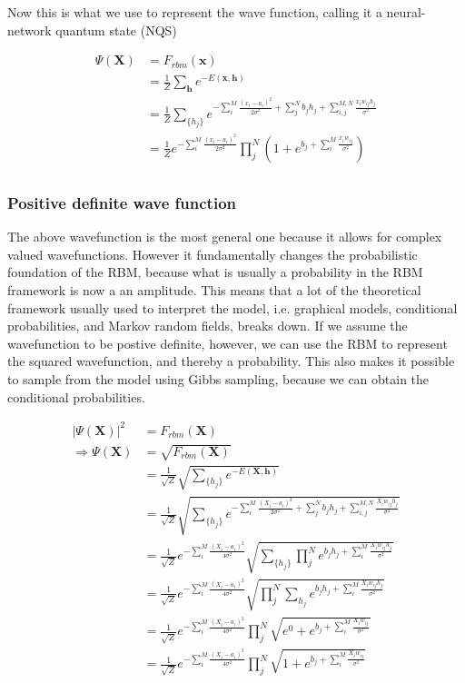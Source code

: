 \documentclass[twoside,english]{uiofysmaster}
\begin{document}
Now this is what we use to represent the wave function, calling it a neural-network quantum state (NQS)

\begin{align}
	\Psi (\mathbf{X}) &= F_{rbm}(\mathbf{x}) \\
	&= \frac{1}{Z}\sum_{\bm{h}} e^{-E(\mathbf{x}, \mathbf{h})} \\
	&= \frac{1}{Z} \sum_{\{h_j\}} e^{-\sum_i^M \frac{(x_i - a_i)^2}{2\sigma^2} + \sum_j^N b_j h_j + \sum_{i,j}^{M,N} \frac{x_i w_{ij} h_j}{\sigma^2}} \\
	&= \frac{1}{Z} e^{-\sum_i^M \frac{(x_i - a_i)^2}{2\sigma^2}} \prod_j^N (1 + e^{b_j + \sum_i^M \frac{x_i w_{ij}}{\sigma^2}}) \\
\end{align}

\subsubsection{Positive definite wave function}
The above wavefunction is the most general one because it allows for complex valued wavefunctions. However it fundamentally changes the probabilistic foundation of the RBM, because what is usually a probability in the RBM framework is now a an amplitude. This means that a lot of the theoretical framework usually used to interpret the model, i.e. graphical models, conditional probabilities, and Markov random fields, breaks down. If we assume the wavefunction to be postive definite, however, we can use the RBM to represent the squared wavefunction, and thereby a probability. This also makes it possible to sample from the model using Gibbs sampling, because we can obtain the conditional probabilities.

\begin{align}
	|\Psi (\mathbf{X})|^2 &= F_{rbm}(\mathbf{X}) \\
	\Rightarrow \Psi (\mathbf{X}) &= \sqrt{F_{rbm}(\mathbf{X})} \\
	&= \frac{1}{\sqrt{Z}}\sqrt{\sum_{\{h_j\}} e^{-E(\mathbf{X}, \mathbf{h})}} \\
	&= \frac{1}{\sqrt{Z}} \sqrt{\sum_{\{h_j\}} e^{-\sum_i^M \frac{(X_i - a_i)^2}{2\sigma^2} + \sum_j^N b_j h_j + \sum_{i,j}^{M,N} \frac{X_i w_{ij} h_j}{\sigma^2}} }\\
	&= \frac{1}{\sqrt{Z}} e^{-\sum_i^M \frac{(X_i - a_i)^2}{4\sigma^2}} \sqrt{\sum_{\{h_j\}} \prod_j^N e^{b_j h_j + \sum_i^M \frac{X_i w_{ij} h_j}{\sigma^2}}} \\
	&= \frac{1}{\sqrt{Z}} e^{-\sum_i^M \frac{(X_i - a_i)^2}{4\sigma^2}} \sqrt{\prod_j^N \sum_{h_j}  e^{b_j h_j + \sum_i^M \frac{X_i w_{ij} h_j}{\sigma^2}}} \\
	&= \frac{1}{\sqrt{Z}} e^{-\sum_i^M \frac{(X_i - a_i)^2}{4\sigma^2}} \prod_j^N \sqrt{e^0 + e^{b_j + \sum_i^M \frac{X_i w_{ij}}{\sigma^2}}} \\
	&= \frac{1}{\sqrt{Z}} e^{-\sum_i^M \frac{(X_i - a_i)^2}{4\sigma^2}} \prod_j^N \sqrt{1 + e^{b_j + \sum_i^M \frac{X_i w_{ij}}{\sigma^2}}} \\
\end{align}
\end{document}
